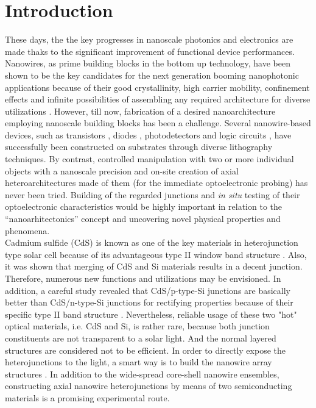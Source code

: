 \section{Introduction}
These days, the the key progresses in nanoscale photonics and electronics are made thaks to the significant improvement of functional device performances. Nanowires, as prime building blocks in the bottom up technology, have been shown to be the key candidates for the next generation booming nanophotonic applications because of their good crystallinity, high carrier mobility, confinement effects and infinite possibilities of assembling any required architecture for diverse utilizations \cite{lieberprogramable2014,tsai2014,zhangx2014}. However, till now, fabrication of a desired nanoarchitecture employing nanoscale building blocks has been a challenge. Several nanowire-based devices, such as transistors \cite{577926446,577926447,577926448}, diodes \cite{577926449}, photodetectors \cite{577926451,577926452} and logic circuits \cite{577926453,577926454}, have successfully been constructed on substrates through diverse lithography techniques. By contrast, controlled manipulation with two or more individual objects with a nanoscale precision and on-site creation of axial heteroarchitectures made of them (for the immediate optoelectronic probing) has never been tried. Building of the regarded junctions and \textit{in situ} testing of their optoelectronic characteristics would be highly important in relation to the “nanoarhitectonics” concept and uncovering novel physical properties and phenomena.\\ 

Cadmium sulfide (CdS) is known as one of the key materials in heterojunction type solar cell because of its advantageous type II window band structure  \cite{577926455}. Also, it was shown that merging of CdS and Si materials results in a decent junction. Therefore, numerous new functions and  utilizations may be envisioned. In addition, a careful study revealed that CdS/p-type-Si junctions are basically better than CdS/n-type-Si junctions for rectifying properties because of their specific type II band structure \cite{577926457}. Nevertheless, reliable usage of these two "hot" optical materials, i.e. CdS and Si, is rather rare, because both junction constituents are not transparent to a solar light. And the normal layered structures are considered not to be efficient. In order to directly expose the heterojunctions to the light, a smart way is to build the nanowire array structures \cite{577926458,577926459}. In addition to the wide-spread core-shell nanowire ensembles, constructing axial nanowire heterojunctions by means of two semiconducting materials is a promising experimental route.\\

